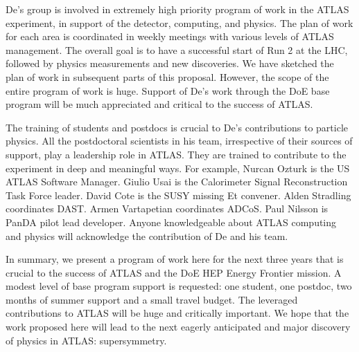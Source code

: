 De's group is involved in extremely high priority program of work in the ATLAS experiment, in support of the detector, computing, and physics. The plan of work for each area is coordinated in weekly meetings with various levels of ATLAS management. The overall goal is to have a successful start of Run 2 at the LHC, followed by physics measurements and new discoveries. We have sketched the plan of work in subsequent parts of this proposal. However, the scope of the entire program of work is huge. Support of De's work through the DoE base program will be much appreciated and critical to the success of ATLAS.

The training of students and postdocs is crucial to De's contributions to particle physics. All the postdoctoral scientists in his team, irrespective of their sources of support, play a leadership role in ATLAS. They are trained to contribute to the experiment in deep and meaningful ways. For example, Nurcan Ozturk is the US ATLAS Software Manager. Giulio Usai is the Calorimeter Signal Reconstruction Task Force leader. David Cote is the SUSY missing Et convener. Alden Stradling coordinates DAST. Armen Vartapetian coordinates ADCoS. Paul Nilsson is PanDA pilot lead developer. Anyone knowledgeable about ATLAS computing and physics will acknowledge the contribution of De and his team.

In summary, we present a program of work here for the next three years that is crucial to the success of ATLAS and the DoE HEP Energy Frontier mission. A modest level of base program support is requested: one student, one postdoc, two months of summer support and a small travel budget. The leveraged contributions to ATLAS will be huge and critically important. We hope that the work proposed here will lead to the next eagerly anticipated and major discovery of physics in ATLAS: supersymmetry.

